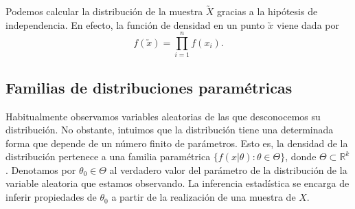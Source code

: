 Podemos calcular la distribución de la muestra $\utilde{X}$ gracias a la hipótesis de independencia. En efecto, la función de densidad en un punto $\utilde{x}$ viene dada por
\[f(\utilde{x})=\prod_{i=1}^{n}{f(x_i)}.\]



\subsection{Familias de distribuciones paramétricas}

Habitualmente observamos variables aleatorias de las que desconocemos su distribución. No obstante, intuimos que la distribución tiene una determinada forma que depende de un número finito de parámetros. Esto es, la densidad de la distribución pertenece a una familia paramétrica $\{f(x | \theta): \theta \in \Theta\}$, donde $\Theta \subset \mathbb{R}^k$. Denotamos por $\theta_0 \in \Theta$ al verdadero valor del parámetro de la distribución de la variable aleatoria que estamos observando. La inferencia estadística se encarga de inferir propiedades de $\theta_0$ a partir de la realización de una muestra de $X$.
